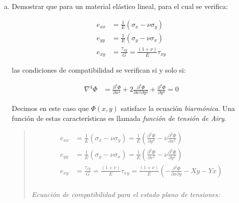 \documentclass[a4paper,10pt,twoside,final,spanish]{article}
\begin{document}
\begin{enumerate}[a.]
\item Demostrar que para un material elástico lineal, para el cual se verifica:

\begin{align*}
e_{xx} &= \frac{1}{E}(\sigma_{x}-\nu\sigma_{y}) \\
e_{yy} &= \frac{1}{E}(\sigma_{y}-\nu\sigma_{x}) \\
e_{xy} &= \frac{\tau_{xy}}{G}=\frac{(1+\nu)}{E}\tau_{xy}
\end{align*}

las condiciones de compatibilidad se verifican si y solo si:

\begin{align*}
\nabla^{4}\Phi &= \frac{\partial^{4}\Phi}{\partial x^{4}}
+2\frac{\partial^{4}\Phi}{\partial x^{2} \partial y^{2}}
+\frac{\partial^{4}\Phi}{\partial y^{4}}=0
\end{align*}

Decimos en este caso que $\Phi(x,y)$ satisface la ecuación \textit{biarmónica}. Una 
función de estas características es llamada \textit{función de tensión de Airy}.  

\begin{quote}

\begin{tcolorbox}[colback=gray!10!white,colframe=black!0!white]

\begin{align*}
e_{xx} &= \frac{1}{E}(\sigma_{x}-\nu\sigma_{y})
= \frac{1}{E}\left(\frac{\partial^{2}\Phi}{\partial y^{2}}
-\nu\frac{\partial^{2}\Phi}{\partial x^{2}}\right) \\
e_{yy} &= \frac{1}{E}(\sigma_{y}-\nu\sigma_{x})
= \frac{1}{E}\left(\frac{\partial^{2}\Phi}{\partial x^{2}}
-\nu\frac{\partial^{2}\Phi}{\partial y^{2}}\right) \\
e_{xy} &= \frac{\tau_{xy}}{G}=\frac{(1+\nu)}{E}\tau_{xy}
= \frac{(1+\nu)}{E}
\left(-\frac{\partial^{2}\Phi}{\partial x \partial y}-Xy-Yx\right) \\
\end{align*}

\textit{Ecuación de compatibilidad para el estado plano de tensiones:}


\end{tcolorbox}
\end{quote}
\end{enumerate}
\end{document}

